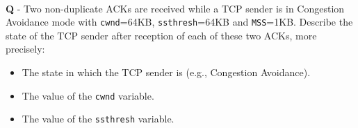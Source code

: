\documentclass{llncs}
\newcounter{ques}
\renewcommand{\question}[1]{\paragraph{}\textbf{Q\theques} - #1\stepcounter{ques} }
\newcommand{\answer}[1]{\color{red}\textit{#1}\color{black}}
\begin{document}
\newpage






\question{Two non-duplicate ACKs are received while a TCP sender is in Congestion Avoidance mode with \texttt{cwnd}=64KB, \texttt{ssthresh}=64KB and \texttt{MSS}=1KB. Describe the state of the TCP sender after reception of each of these two ACKs, more precisely:
  \begin{itemize}
  \item The state in which the TCP sender is (e.g., Congestion Avoidance).
  \item The value of the \texttt{cwnd} variable.
  \item The value of the \texttt{ssthresh} variable.
  \end{itemize}
}

\end{document}
